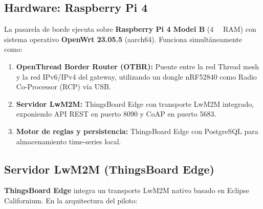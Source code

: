 \documentclass[11pt,a4paper]{article}
\begin{document}
\subsection{Hardware: Raspberry Pi 4}

La pasarela de borde ejecuta sobre \textbf{Raspberry Pi 4 Model B} (\SI{4}{\giga\byte} RAM) con sistema operativo \textbf{OpenWrt 23.05.5} (aarch64). Funciona simultáneamente como:

\begin{enumerate}[leftmargin=1.5cm]
    \item \textbf{OpenThread Border Router (OTBR):} Puente entre la red Thread mesh y la red IPv6/IPv4 del gateway, utilizando un dongle nRF52840 como Radio Co-Processor (RCP) vía USB.
    \item \textbf{Servidor LwM2M:} ThingsBoard Edge con transporte LwM2M integrado, exponiendo API REST en puerto 8090 y CoAP en puerto 5683.
    \item \textbf{Motor de reglas y persistencia:} ThingsBoard Edge con PostgreSQL para almacenamiento time-series local.
\end{enumerate}

\subsection{Servidor LwM2M (ThingsBoard Edge)}

\textbf{ThingsBoard Edge} integra un transporte LwM2M nativo basado en Eclipse Californium. En la arquitectura del piloto:
\end{document}
